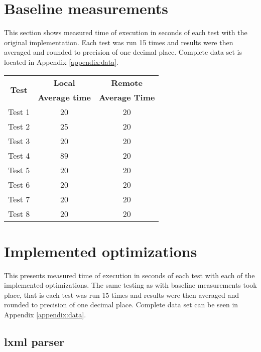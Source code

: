 \section{Baseline measurements}
This section shows measured time of execution in seconds of each test with the original implementation. Each test was run 15 times and results were then averaged and rounded to precision of one decimal place. Complete data set is located in Appendix \ref{appendix:data}.

\shorthandoff{-}
\begin{center}
    \begin{tabular}{| c | c | c |}
    \hline
    \multirow{2}{*}{\textbf{Test}} & \textbf{Local} & \textbf{Remote} \\ \cline{2-3}
    & \textbf{Average time} & \textbf{Average Time} \\ \hline
    Test 1 & 20 & 20 \\ \hline
    Test 2 & 25 & 20  \\ \hline
    Test 3 & 20 & 20 \\ \hline
    Test 4 & 89 & 20 \\ \hline
    Test 5 & 20 & 20 \\ \hline
    Test 6 & 20 & 20 \\ \hline
    Test 7 & 20 & 20 \\ \hline
    Test 8 & 20 & 20 \\ \hline
    \end{tabular}
\end{center}
\shorthandon{-}

\section{Implemented optimizations}
This presents measured time of execution in seconds of each test with each of the implemented optimizations. The same testing as with baseline measurements took place, that is each test was run 15 times and results were then averaged and rounded to precision of one decimal place. Complete data set can be seen in Appendix \ref{appendix:data}.

\subsection{lxml parser}


